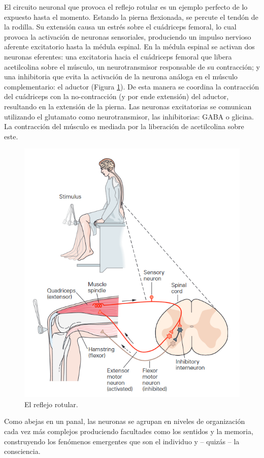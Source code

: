 El circuito neuronal que provoca el reflejo rotular es un ejemplo perfecto de lo expuesto hasta el momento. Estando la pierna flexionada, se percute el tendón de la rodilla. Su extensión causa un estrés sobre el cuádriceps femoral, lo cual provoca la activación de neuronas sensoriales, produciendo un impulso nervioso aferente excitatorio hasta la médula espinal. En la médula espinal se activan dos neuronas eferentes: una excitatoria hacia el cuádriceps femoral que libera acetilcolina sobre el músculo, un neurotransmisor responsable de su contracción; y una inhibitoria que evita la activación de la neurona análoga en el músculo complementario: el aductor (Figura \ref{sn}). De esta manera se coordina la contracción del cuádriceps con la no-contracción (y por ende extensión) del aductor, resultando en la extensión de la pierna. Las neuronas excitatorias se comunican utilizando el glutamato como neurotransmisor, las inhibitorias: GABA o glicina. La contracción del músculo es mediada por la liberación de acetilcolina sobre este.

\begin{figure}[H]
	\centering

	\includegraphics[width=.8\linewidth]{media/7-sn.png}
	\caption{El reflejo rotular.}
	\label{sn}
\end{figure}

Como abejas en un panal, las neuronas se agrupan en niveles de organización cada vez más complejos produciendo facultades como los sentidos y la memoria, construyendo los fenómenos emergentes que son el individuo y – quizás – la consciencia.

